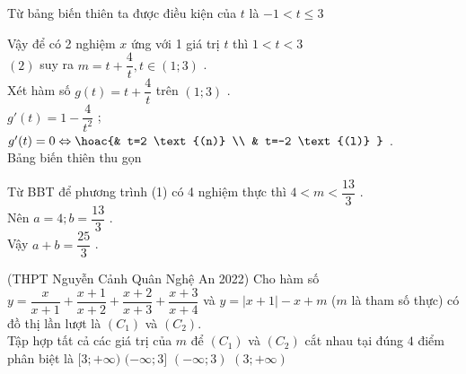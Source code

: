 \begin{ex}
{\begin{itemize}
		Từ bảng biến thiên ta được điều kiện của  $  t $  là  $ -1<t\le 3 $ \\
		\end{itemize}
		Vậy để có 2 nghiệm  $  x $  ứng với 1 giá trị  $  t $  thì  $ 1<t<3 $ \\
		$ (2) $  suy ra  $  m=t+\dfrac{4}{t},t\in (1;3) $ .\\
		Xét hàm số  $  g(t)=t+\dfrac{4}{t} $  trên  $ (1;3) $ .\\
		$ g'(t)=1-\dfrac{4}{t^2} $ ;  $ g'(t)=0\Leftrightarrow \hoac{& t=2 \text{(n)} \\ & t=-2 \text{(l)} } $ .\\
		Bảng biến thiên thu gọn\\
		\begin{center}
		\end{center}
		Từ BBT để phương trình (1) có 4 nghiệm thực thì  $ 4<m<\dfrac{13}{3} $ .\\
		 Nên  $  a=4;b=\dfrac{13}{3} $ .\\
		Vậy  $  a+b=\dfrac{25}{3} $ .}
\end{ex}
\begin{ex}%
	(THPT Nguyễn Cảnh Quân Nghệ  An 2022) Cho hàm số
	$y=\dfrac{x}{x+1}+\dfrac{x+1}{x+2}+\dfrac{x+2}{x+3}+\dfrac{x+3}{x+4}$  và  $y=|x+1|-x+m$  ($m$  là tham số thực)
	có đồ thị lần lượt là  $(C_1) $  và  $(C_2)$.\\
	Tập hợp tất cả các giá trị của  $ m $  để $(C_1)$  và  $(C_2)$	cắt nhau tại đúng $ 4 $ điểm phân biệt là
	\choice
	{\True  $ [ 3;+\infty) $}
	{$ (-\infty ;3 ] $}
	{$ (-\infty ;3) $}
	{$ (3;+\infty) $}
\end{ex}
